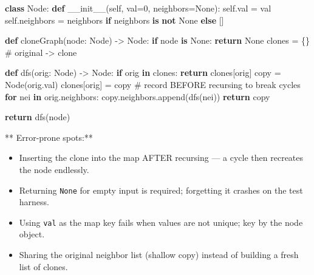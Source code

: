 \documentclass[11pt]{article}
\providecommand{\tightlist}{\setlength{\itemsep}{1pt}\setlength{\parskip}{0pt}}
\newenvironment{Shaded}{\begin{snugshade}}{\end{snugshade}}
\newcommand{\CommentTok}[1]{\textcolor[rgb]{0.48,0.49,0.49}{#1}}
\newcommand{\ControlFlowTok}[1]{\textcolor[rgb]{0.99,0.74,0.29}{\textbf{#1}}}
\newcommand{\DecValTok}[1]{\textcolor[rgb]{0.96,0.45,0.00}{#1}}
\newcommand{\FunctionTok}[1]{\textcolor[rgb]{0.56,0.27,0.68}{#1}}
\newcommand{\KeywordTok}[1]{\textcolor[rgb]{0.81,0.81,0.76}{\textbf{#1}}}
\newcommand{\NormalTok}[1]{\textcolor[rgb]{0.81,0.81,0.76}{#1}}
\newcommand{\OperatorTok}[1]{\textcolor[rgb]{0.81,0.81,0.76}{#1}}
\newcommand{\StringTok}[1]{\textcolor[rgb]{0.96,0.31,0.31}{#1}}
\newcommand{\VariableTok}[1]{\textcolor[rgb]{0.15,0.68,0.68}{#1}}
\begin{document}
\begin{Shaded}
\begin{Highlighting}[]
\KeywordTok{class}\NormalTok{ Node:}
    \KeywordTok{def} \FunctionTok{\_\_init\_\_}\NormalTok{(}\VariableTok{self}\NormalTok{, val}\OperatorTok{=}\DecValTok{0}\NormalTok{, neighbors}\OperatorTok{=}\VariableTok{None}\NormalTok{):}
        \VariableTok{self}\NormalTok{.val }\OperatorTok{=}\NormalTok{ val}
        \VariableTok{self}\NormalTok{.neighbors }\OperatorTok{=}\NormalTok{ neighbors }\ControlFlowTok{if}\NormalTok{ neighbors }\KeywordTok{is} \KeywordTok{not} \VariableTok{None} \ControlFlowTok{else}\NormalTok{ []}

\KeywordTok{def}\NormalTok{ cloneGraph(node: }\StringTok{\textquotesingle{}Node\textquotesingle{}}\NormalTok{) }\OperatorTok{{-}\textgreater{}} \StringTok{\textquotesingle{}Node\textquotesingle{}}\NormalTok{:}
    \ControlFlowTok{if}\NormalTok{ node }\KeywordTok{is} \VariableTok{None}\NormalTok{:}
        \ControlFlowTok{return} \VariableTok{None}
\NormalTok{    clones }\OperatorTok{=}\NormalTok{ \{\}  }\CommentTok{\# original {-}\textgreater{} clone}

    \KeywordTok{def}\NormalTok{ dfs(orig: }\StringTok{\textquotesingle{}Node\textquotesingle{}}\NormalTok{) }\OperatorTok{{-}\textgreater{}} \StringTok{\textquotesingle{}Node\textquotesingle{}}\NormalTok{:}
        \ControlFlowTok{if}\NormalTok{ orig }\KeywordTok{in}\NormalTok{ clones:}
            \ControlFlowTok{return}\NormalTok{ clones[orig]}
\NormalTok{        copy }\OperatorTok{=}\NormalTok{ Node(orig.val)}
\NormalTok{        clones[orig] }\OperatorTok{=}\NormalTok{ copy            }\CommentTok{\# record BEFORE recursing to break cycles}
        \ControlFlowTok{for}\NormalTok{ nei }\KeywordTok{in}\NormalTok{ orig.neighbors:}
\NormalTok{            copy.neighbors.append(dfs(nei))}
        \ControlFlowTok{return}\NormalTok{ copy}

    \ControlFlowTok{return}\NormalTok{ dfs(node)}
\end{Highlighting}
\end{Shaded}

** Error-prone spots:**

\begin{itemize}
\tightlist
\item
  Inserting the clone into the map AFTER recursing --- a cycle then recreates the node endlessly.
\item
  Returning \texttt{None} for empty input is required; forgetting it crashes on the test harness.
\item
  Using \texttt{val} as the map key fails when values are not unique; key by the node object.
\item
  Sharing the original neighbor list (shallow copy) instead of building a fresh list of clones.
\end{itemize}
\end{document}
